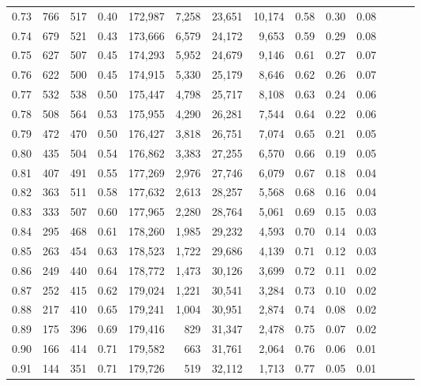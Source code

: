 \begin{tabular}{rrrrrrrrrrrrrr}
0.73 &    766 &  517 &  0.40 &  172,987 &    7,258 &  23,651 &  10,174 &  0.58 &  0.30 &      0.08 \\
0.74 &    679 &  521 &  0.43 &  173,666 &    6,579 &  24,172 &   9,653 &  0.59 &  0.29 &      0.08 \\
0.75 &    627 &  507 &  0.45 &  174,293 &    5,952 &  24,679 &   9,146 &  0.61 &  0.27 &      0.07 \\
0.76 &    622 &  500 &  0.45 &  174,915 &    5,330 &  25,179 &   8,646 &  0.62 &  0.26 &      0.07 \\
0.77 &    532 &  538 &  0.50 &  175,447 &    4,798 &  25,717 &   8,108 &  0.63 &  0.24 &      0.06 \\
0.78 &    508 &  564 &  0.53 &  175,955 &    4,290 &  26,281 &   7,544 &  0.64 &  0.22 &      0.06 \\
0.79 &    472 &  470 &  0.50 &  176,427 &    3,818 &  26,751 &   7,074 &  0.65 &  0.21 &      0.05 \\
0.80 &    435 &  504 &  0.54 &  176,862 &    3,383 &  27,255 &   6,570 &  0.66 &  0.19 &      0.05 \\
0.81 &    407 &  491 &  0.55 &  177,269 &    2,976 &  27,746 &   6,079 &  0.67 &  0.18 &      0.04 \\
0.82 &    363 &  511 &  0.58 &  177,632 &    2,613 &  28,257 &   5,568 &  0.68 &  0.16 &      0.04 \\
0.83 &    333 &  507 &  0.60 &  177,965 &    2,280 &  28,764 &   5,061 &  0.69 &  0.15 &      0.03 \\
0.84 &    295 &  468 &  0.61 &  178,260 &    1,985 &  29,232 &   4,593 &  0.70 &  0.14 &      0.03 \\
0.85 &    263 &  454 &  0.63 &  178,523 &    1,722 &  29,686 &   4,139 &  0.71 &  0.12 &      0.03 \\
0.86 &    249 &  440 &  0.64 &  178,772 &    1,473 &  30,126 &   3,699 &  0.72 &  0.11 &      0.02 \\
0.87 &    252 &  415 &  0.62 &  179,024 &    1,221 &  30,541 &   3,284 &  0.73 &  0.10 &      0.02 \\
0.88 &    217 &  410 &  0.65 &  179,241 &    1,004 &  30,951 &   2,874 &  0.74 &  0.08 &      0.02 \\
0.89 &    175 &  396 &  0.69 &  179,416 &      829 &  31,347 &   2,478 &  0.75 &  0.07 &      0.02 \\
0.90 &    166 &  414 &  0.71 &  179,582 &      663 &  31,761 &   2,064 &  0.76 &  0.06 &      0.01 \\
0.91 &    144 &  351 &  0.71 &  179,726 &      519 &  32,112 &   1,713 &  0.77 &  0.05 &      0.01 \\

\end{tabular}

